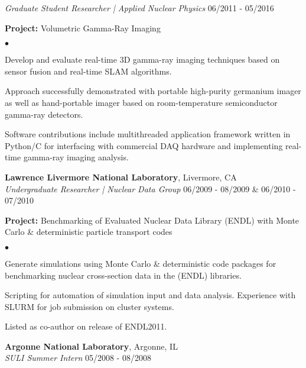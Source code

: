 \documentclass[margin,line]{res}
\newenvironment{list1}{
  \begin{list}{\ding{113}}{%
      \setlength{\itemsep}{0in}
      \setlength{\parsep}{0in} \setlength{\parskip}{0in}
      \setlength{\topsep}{0in} \setlength{\partopsep}{0in} 
      \setlength{\leftmargin}{0.17in}}}{\end{list}}
\newenvironment{list2}{
  \begin{list}{$\bullet$}{%
      \setlength{\itemsep}{0in}
      \setlength{\parsep}{0in} \setlength{\parskip}{0in}
      \setlength{\topsep}{0in} \setlength{\partopsep}{0in} 
      \setlength{\leftmargin}{0.2in}}}{\end{list}}
\begin{document}
\begin{resume}
{\em Graduate Student Researcher | Applied Nuclear Physics} \hfill 06/2011 - 05/2016

\begin{list1}
  \item[] {\bf \small Project:} Volumetric Gamma-Ray Imaging
  \begin{list2}
    \item Develop and evaluate real-time 3D gamma-ray imaging techniques based
          on sensor fusion and real-time SLAM algorithms.
    \item Approach successfully demonstrated with portable high-purity 
          germanium imager as well as hand-portable imager based on 
          room-temperature semiconductor gamma-ray detectors.
    \item Software contributions include multithreaded application framework
          written in Python/C for interfacing with commercial DAQ hardware and
          implementing real-time gamma-ray imaging analysis.
  \end{list2}
\end{list1}

{\bf Lawrence Livermore National Laboratory}, Livermore, CA \\ 
{\em Undergraduate Researcher | Nuclear Data Group} \hfill 06/2009 - 08/2009 \& 06/2010 - 07/2010

\begin{list1}
  \item[] {\bf \small Project:} Benchmarking of Evaluated Nuclear Data Library
                                (ENDL) with Monte Carlo \& deterministic
                                particle transport codes
  \begin{list2}
    \item Generate simulations using Monte Carlo \& deterministic code packages
          for benchmarking nuclear cross-section data in the (ENDL) libraries.
    \item Scripting for automation of simulation input and data analysis.
          Experience with SLURM for job submission on cluster systems.
    \item Listed as co-author on release of ENDL2011.
  \end{list2}
\end{list1}

{\bf Argonne National Laboratory}, Argonne, IL \\ 
{\em SULI Summer Intern} \hfill 05/2008 - 08/2008


\end{resume}
\end{document}
